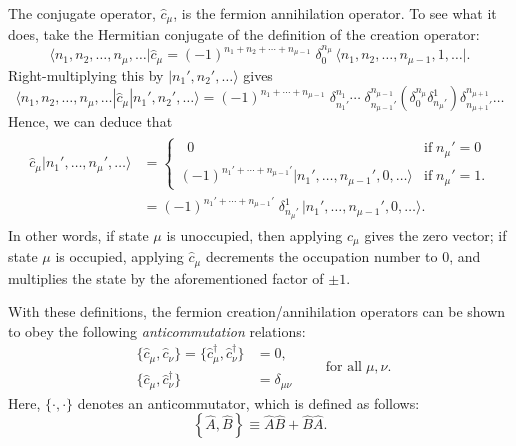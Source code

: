 \documentclass[pra,12pt]{revtex4}
\begin{document}
The conjugate operator, $\hat{c}_\mu$, is the fermion annihilation
operator.  To see what it does, take the Hermitian conjugate of the
definition of the creation operator:
\begin{equation}
  \langle n_1, n_2, \dots, n_\mu,\dots| \hat{c}_\mu  =
  (-1)^{n_1 + n_2 + \cdots + n_{\mu-1}}\; \delta^{n_\mu}_0\, \big\langle n_1, n_2, \dots, n_{\mu-1}, 1, \dots\big|.
\end{equation}
Right-multiplying this by $|n_1',n_2',\dots\rangle$ gives
\begin{equation}
  \langle n_1, n_2, \dots, n_\mu,\dots| \hat{c}_\mu |n_1', n_2', \dots\rangle  = (-1)^{n_1 + \cdots + n_{\mu-1}} \;\delta^{n_1}_{n_1'} \cdots \;\delta^{n_{\mu-1}}_{n_{\mu-1}'} \left(\delta^{n_\mu}_0 \delta^1_{n_\mu'} \right) \delta^{n_{\mu+1}}_{n_{\mu+1}'} \dots
\end{equation}
Hence, we can deduce that
\begin{align}
  \begin{aligned}\hat{c}_\mu |n_1', \dots, n_\mu',\dots\rangle &= \begin{cases} \;\;0 & \mathrm{if}\; n_\mu' = 0 \\ (-1)^{n_1' + \cdots + n_{\mu-1}'} |n_1', \dots, n_{\mu-1}', 0, \dots\rangle & \mathrm{if} \; n_\mu' = 1. \end{cases} \\ &= (-1)^{n_1' + \cdots + n_{\mu-1}'} \; \delta^1_{n_\mu'} \, \big|n_1', \dots, n_{\mu-1}', 0, \dots\big\rangle.\end{aligned}
\end{align}
In other words, if state $\mu$ is unoccupied, then applying
$\hat{c}_\mu$ gives the zero vector; if state $\mu$ is occupied,
applying $\hat{c}_\mu$ decrements the occupation number to $0$, and
multiplies the state by the aforementioned factor of $\pm 1$.

With these definitions, the fermion creation/annihilation operators
can be shown to obey the following \textit{anticommutation} relations:
$$\boxed{\quad\begin{aligned}\,\big\{\hat{c}_\mu,\hat{c}_\nu\big\} = \big\{\hat{c}_\mu^\dagger,\hat{c}_\nu^\dagger\big\} &= 0, \\ \,\big\{\hat{c}_\mu,\hat{c}_\nu^\dagger\big\} &= \delta_{\mu\nu}\end{aligned}\qquad\textrm{for all}\;\mu,\nu.\quad}$$
Here, $\{\cdot,\cdot\}$ denotes an anticommutator, which is defined as
follows:
\begin{equation}
  \left\{\hat{A},\hat{B}\right\} \equiv \hat{A}\hat{B} + \hat{B}\hat{A}.
\end{equation}
\end{document}
